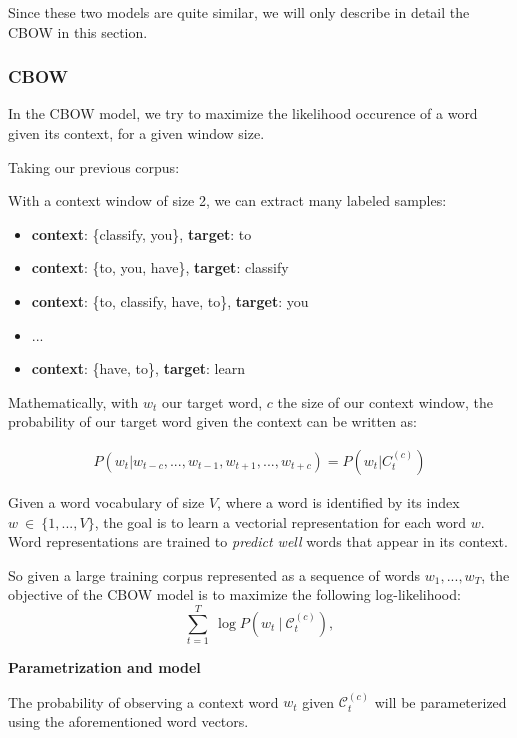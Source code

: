 Since these two models are quite similar, we will only describe in detail the CBOW in this section.

\subsubsection{CBOW}

In the CBOW model, we try to maximize the likelihood occurence of a word given its context, for a given window size.

Taking our previous corpus: 


With a context window of size 2, we can extract many labeled samples:
\begin{itemize}
	\item \textbf{context}: \{classify, you\}, \textbf{target}: to
	\item \textbf{context}: \{to, you, have\}, \textbf{target}: classify
	\item \textbf{context}: \{to, classify, have, to\}, \textbf{target}: you
	\item ...
	\item \textbf{context}: \{have, to\}, \textbf{target}: learn
\end{itemize}


Mathematically, with $w_t$ our target word, $c$ the size of our context window, the probability of our target word given the context can be written as:

\begin{align}
	P(w_t | w_{t-c}, ..., w_{t-1}, w_{t+1}, ... ,w_{t+c}) = P(w_t | C_t^{(c)})
\end{align}

Given a word vocabulary of size $V$, where a word is identified by its index $w~\in~\{1, ..., V\}$, the goal is to learn a vectorial representation for each word $w$. Word representations are trained to \emph{predict well} words that appear in its context.

So given a large training corpus represented as a sequence of words $w_1, ..., w_T$, the objective of the CBOW model is to maximize the following log-likelihood:
\begin{equation*}
  \sum_{t=1}^T \ \log P(w_t \ | \ \mathcal{C}_t^{(c)}),
\end{equation*}

\textbf{Parametrization and model}

The probability of observing a context word $w_t$ given $\mathcal{C}_t^{(c)}$ will be parameterized using the aforementioned word vectors.

